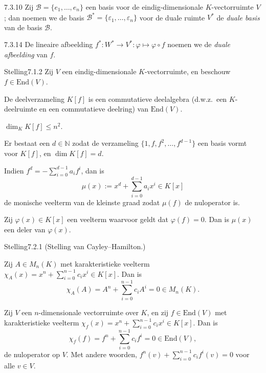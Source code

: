 \begin{res}{7.3.10}
Zij $\mathcal B=\{e_1,\dots,e_n\}$ een basis voor de eindig-dimensionale $K$-vectorruimte $V$; dan noemen we de basis $\mathcal B^*=\{\varepsilon_1,\dots,\varepsilon_n\}$ voor de duale ruimte $V^*$ de \textit{duale basis} van de basis $\mathcal B$.
\end{res}

\begin{res}{7.3.14}
De lineaire afbeelding $f^*:W^*\to V^*:\varphi\mapsto\varphi\circ f$ noemen we de \textit{duale afbeelding} van $f$.
\end{res}



\begin{res}{Stelling}{7.1.2}
Zij $V$ een eindig-dimensionale $K$-vectorruimte, en beschouw $f\in\mathrm{End}(V)$.
\begin{myenum}
\item De deelverzameling $K[f]$ is een commutatieve deelalgebra (d.w.z.\ een $K$-deelruimte en een commutatieve deelring) van $\mathrm{End}(V)$.
\item $\dim_K K[f]\le n^2$.
\item Er bestaat een $d\in\mathbb N$ zodat de verzameling $\{1,f,f^2,\dots,f^{d-1}\}$ een basis vormt voor $K[f]$, en $\dim K[f]=d$.
\item Indien $f^d=-\sum_{i=0}^{d-1}a_if^i$, dan is
\[
\mu(x):=x^d+\sum_{i=0}^{d-1}a_ix^i\in K[x]
\]
de monische veelterm van de kleinste graad zodat $\mu(f)$ de nuloperator is.
\item Zij $\varphi(x)\in K[x]$ een veelterm waarvoor geldt dat $\varphi(f)=0$. Dan is $\mu(x)$ een deler van $\varphi(x)$.
\end{myenum}
\end{res}

\begin{res}{Stelling}{7.2.1}
\textup{(Stelling van Cayley--Hamilton.)}
\begin{myenum}
\item Zij $A\in M_n(K)$ met karakteristieke veelterm $\chi_A(x)=x^n+\sum_{i=0}^{n-1}c_ix^i\in K[x]$. Dan is
\[
\chi_A(A)=A^n+\sum_{i=0}^{n-1}c_iA^i=0\in M_n(K).
\]
\item Zij $V$ een $n$-dimensionale vectorruimte over $K$, en zij $f\in\mathrm{End}(V)$ met karakteristieke veelterm $\chi_f(x)=x^n+\sum_{i=0}^{n-1}c_ix^i\in K[x]$. Dan is
\[
\chi_f(f)=f^n+\sum_{i=0}^{n-1}c_if^i=0\in\mathrm{End}(V),
\]
de nuloperator op $V$. Met andere woorden, $f^n(v)+\sum_{i=0}^{n-1}c_if^i(v)=0$ voor alle $v\in V$.
\end{myenum}
\end{res}

